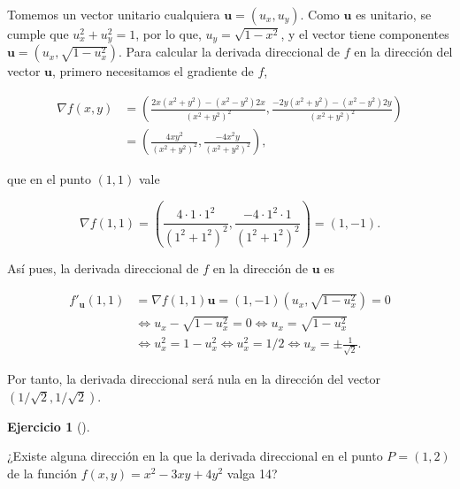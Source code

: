 \documentclass[
  spanish,
  a4paper,
]{scrreport}
\theoremstyle{definition}
\newtheorem{exercise}{Ejercicio}[chapter]
\theoremstyle{remark}
\begin{document}
\begin{tcolorbox}[enhanced jigsaw, arc=.35mm, bottomrule=.15mm, bottomtitle=1mm, breakable, colback=white, colbacktitle=quarto-callout-tip-color!10!white, colframe=quarto-callout-tip-color-frame, coltitle=black, left=2mm, leftrule=.75mm, opacityback=0, opacitybacktitle=0.6, rightrule=.15mm, title=\textcolor{quarto-callout-tip-color}{\faLightbulb}\hspace{0.5em}{Solución}, titlerule=0mm, toprule=.15mm, toptitle=1mm]

Tomemos un vector unitario cualquiera \(\mathbf{u}=(u_x,u_y)\). Como
\(\mathbf{u}\) es unitario, se cumple que \(u_x^2+u_y^2=1\), por lo que,
\(u_y=\sqrt{1-x^2}\), y el vector tiene componentes
\(\mathbf{u}=(u_x,\sqrt{1-u_x^2})\). Para calcular la derivada
direccional de \(f\) en la dirección del vector \(\mathbf{u}\), primero
necesitamos el gradiente de \(f\),

\begin{align*}
\nabla f(x,y)
&= \left(\frac{2x(x^2+y^2)-(x^2-y^2)2x}{(x^2+y^2)^2}, \frac{-2y(x^2+y^2)-(x^2-y^2)2y}{(x^2+y^2)^2}\right) \\
&=  \left(\frac{4xy^2}{(x^2+y^2)^2}, \frac{-4x^2y}{(x^2+y^2)^2}\right),
\end{align*}

que en el punto \((1,1)\) vale

\[
\nabla f(1,1) = \left(\frac{4\cdot 1\cdot 1^2}{(1^2+1^2)^2}, \frac{-4\cdot 1^2\cdot 1}{(1^2+1^2)^2}\right) = (1,-1).
\]

Así pues, la derivada direccional de \(f\) en la dirección de
\(\mathbf{u}\) es

\begin{align*}
f'_{\mathbf{u}}(1,1) 
&= \nabla{f}(1,1)\mathbf{u} 
= (1, -1)(u_x, \sqrt{1-u_x^2}) = 0 \\
&\Leftrightarrow u_x - \sqrt{1-u_x^2} = 0 
\Leftrightarrow u_x = \sqrt{1-u_x^2} \\
&\Leftrightarrow u_x^2 = 1-u_x^2 
\Leftrightarrow u_x^2 = 1/2
\Leftrightarrow u_x = \pm\frac{1}{\sqrt{2}}. 
\end{align*}

Por tanto, la derivada direccional será nula en la dirección del vector
\((1/\sqrt{2}, 1/\sqrt{2})\).

\end{tcolorbox}

\begin{exercise}[]\protect\hypertarget{exr-derivada-direccional}{}\label{exr-derivada-direccional}

¿Existe alguna dirección en la que la derivada direccional en el punto
\(P=(1,2)\) de la función \(f(x,y) = x^2-3xy+4y^2\) valga 14?

\end{exercise}
\end{document}
